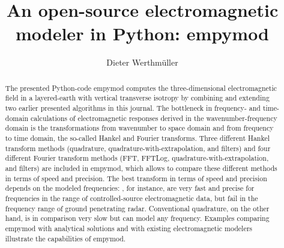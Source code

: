 \documentclass[paper]{geophysics}
\begin{document}
\title{An open-source  electromagnetic modeler  in Python: empymod}

\renewcommand{\thefootnote}{1}%


\address{Instituto Mexicano del Petróleo,
         Eje Central Lázaro Cárdenas Norte 152,
         Col. San Bartolo Atepehuacan C.P. 07730,
         Ciudad de México, México.
         E-mail: \href{mailto:dieter@werthmuller.org}{Dieter@Werthmuller.org}.}

\author{Dieter Werthmüller\footnotemark[1]}

\footer{}

\maketitle

\begin{abstract} %
  The presented Python-code empymod computes the three-dimensional
  electromagnetic field in a layered-earth with vertical transverse isotropy by
  combining and extending two earlier presented algorithms in this journal.
  The bottleneck in frequency- and time-domain calculations of electromagnetic
  responses derived in the wavenumber-frequency domain is the transformations
  from wavenumber to space domain and from frequency to time domain, the
  so-called Hankel and Fourier transforms. Three different Hankel transform
  methods (quadrature, quadrature-with-extrapolation, and filters) and four
  different Fourier transform methods (FFT, FFTLog,
  quadrature-with-extrapolation, and filters) are included in empymod, which
  allows to compare these different methods in terms of speed and precision.
  The best transform in terms of speed and precision depends on the modeled
  frequencies: , for instance, are very fast and precise for frequencies in
  the range of controlled-source electromagnetic data, but fail in the
  frequency range of ground penetrating radar. Conventional quadrature, on the
  other hand, is in comparison very slow but can model any frequency.  Examples
  comparing empymod with analytical solutions and with existing electromagnetic
  modelers illustrate the capabilities of empymod.
\end{abstract}
\end{document}
